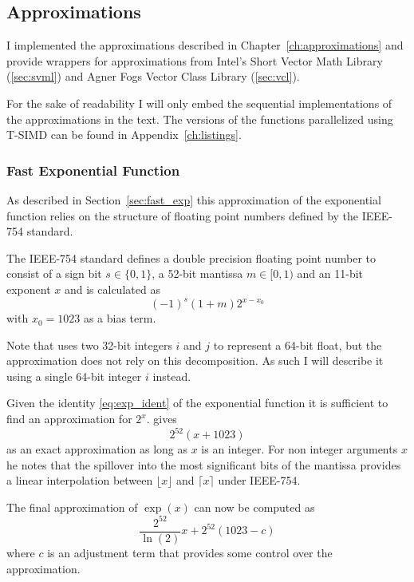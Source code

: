 \documentclass[a4paper, 11pt]{memoir}
\begin{document}
    \subsection{Approximations}
    \label{sec:impl_approx}
    I implemented the approximations described in Chapter~\ref{ch:approximations} and provide wrappers for
    approximations from Intel's Short Vector Math Library (\ref{sec:svml}) and Agner Fogs Vector Class Library
    (\ref{sec:vcl}).

    For the sake of readability I will only embed the sequential implementations of the approximations in the text. The
    versions of the functions parallelized using T-SIMD can be found in Appendix~\ref{ch:listings}.

    \subsubsection{Fast Exponential Function}
    \label{sec:impl_fast_exp}
    As described in Section~\ref{sec:fast_exp} this approximation of the exponential function relies on the structure of
    floating point numbers defined by the IEEE-754 standard.

    The IEEE-754 standard defines a double precision floating point number to consist of a sign bit $s \in \{ 0, 1 \}$,
    a 52-bit mantissa $m \in [0, 1)$ and an 11-bit exponent $x$ and is calculated as
    \begin{equation}
        (-1)^s (1 + m) 2^{x - x_0}
        \label{eq:def_ieee754}
    \end{equation}
    with $x_0 = 1023$ as a bias term.

    Note that \citeauthor{fast_exp} uses two 32-bit integers $i$ and $j$ to represent a 64-bit float, but the
    approximation does not rely on this decomposition. As such I will describe it using a single 64-bit integer $i$ instead.

    Given the identity \eqref{eq:exp_ident} of the exponential function it is sufficient to find an approximation for
    $2^x$. \citeauthor{fast_exp} gives
    \begin{equation}
        2^{52}(x + 1023)
    \end{equation}
    as an exact approximation as long as $x$ is an integer. For non integer arguments $x$ he notes that the spillover into
    the most significant bits of the mantissa provides a linear interpolation between $\lfloor x \rfloor$ and $\lceil x
    \rceil$ under IEEE-754.

    The final approximation of $\exp{(x)}$ can now be computed as
    \begin{equation}
        \frac{2^{52}}{\ln{(2)}} x + 2^{52}(1023 - c)
    \end{equation}
    where $c$ is an adjustment term that provides some control over the approximation.
\end{document}
